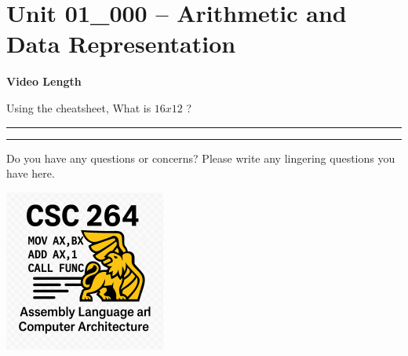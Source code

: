 \documentclass[letterpaper,12pt]{exam}
\newcommand{\unit}{Unit 01}
\begin{document}
\section*{\unit\_000 -- Arithmetic and Data Representation} 
\par{\selectfont\textbf{Video Length }}
\begin{questions}

 \begin{samepage} 
     \question Using the cheatsheet, What is $ 16 x 12 $ ? \rule{2cm}{0.15mm}     \vspace{5mm}
 \end{samepage}
 \par
  

\begin{center}
    \rule{0.5\textwidth}{.4pt}
\end{center}
Do you have any questions or concerns? Please write any lingering questions you have here.

\end{questions}
\vfill
\begin{center}
\includegraphics{../csc264Logo}
\end{center}
\end{document}
